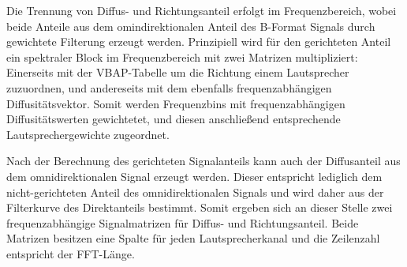 Die Trennung von Diffus- und Richtungsanteil erfolgt im Frequenzbereich, wobei beide Anteile aus dem omindirektionalen Anteil des B-Format Signals durch gewichtete Filterung erzeugt werden. Prinzipiell wird für den gerichteten Anteil ein spektraler Block im Frequenzbereich mit zwei Matrizen multipliziert: Einerseits mit der VBAP-Tabelle um die Richtung einem Lautsprecher zuzuordnen, und andereseits mit dem ebenfalls frequenzabhängigen Diffusitätsvektor. Somit werden Frequenzbins mit frequenzabhängigen Diffusitätswerten gewichtetet, und diesen anschließend entsprechende Lautsprechergewichte zugeordnet.

Nach der Berechnung des gerichteten Signalanteils kann auch der Diffusanteil aus dem omnidirektionalen Signal erzeugt werden. Dieser entspricht lediglich dem nicht-gerichteten Anteil des omnidirektionalen Signals und wird daher aus der Filterkurve des Direktanteils bestimmt. Somit ergeben sich an dieser Stelle zwei frequenzabhängige Signalmatrizen für Diffus- und Richtungsanteil. Beide Matrizen besitzen eine Spalte für jeden Lautsprecherkanal und die Zeilenzahl entspricht der FFT-Länge.
